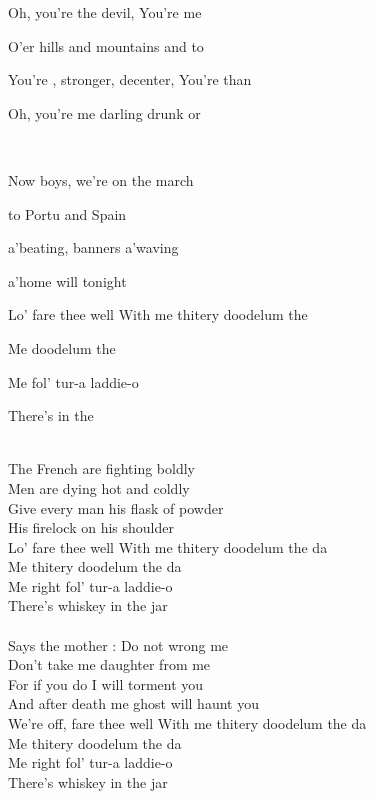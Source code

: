 \begin{SBChorus}
Oh,  you're the devil, You're  me 

O'er hills and mountains and to 

You're , stronger, decenter, You're  than 

Oh,  you're me darling drunk or 
\end{SBChorus}
~\\
\begin{SBVerse*}
Now  boys, we're on the march

 to Portu and Spain

 a'beating, banners a'waving

 a'home will  tonight

Lo' fare thee well With me thitery doodelum the 

Me  doodelum the 

Me  fol' tur-a laddie-o

There's  in the 
\end{SBVerse*}
~\\
The French are fighting boldly \\
Men are dying hot and coldly \\
Give every man his flask of powder \\
His firelock on his shoulder \\
Lo' fare thee well With me thitery doodelum the da\\
Me thitery doodelum the da\\
Me right fol' tur-a laddie-o \\
There's whiskey in the jar \\
\\
Says the mother : \og Do not wrong me\\
Don't take me daughter from me \\
For if you do I will torment you \\
And after death me ghost will haunt you \fg \\
We're off, fare thee well With me thitery doodelum the da\\
Me thitery doodelum the da\\
Me right fol' tur-a laddie-o \\
There's whiskey in the jar \\